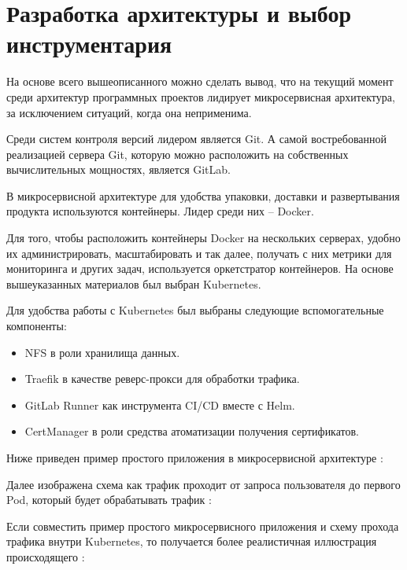 \section{Разработка архитектуры и выбор инструментария}
\label{sec:tools}

На основе всего вышеописанного можно сделать вывод, что на текущий момент среди архитектур программных проектов лидирует микросервисная архитектура, за исключением ситуаций, когда она неприменима.

Среди систем контроля версий лидером является Git. А самой востребованной реализацией сервера Git, которую можно расположить на собственных вычислительных мощностях, является GitLab.

В микросервисной архитектуре для удобства упаковки, доставки и развертывания продукта используются контейнеры. Лидер среди них -- Docker.

Для того, чтобы расположить контейнеры Docker на нескольких серверах, удобно их администрировать, масштабировать и так далее, получать с них метрики для мониторинга и других задач, используется оркетстратор контейнеров. На основе вышеуказанных материалов был выбран Kubernetes.

Для удобства работы с Kubernetes был выбраны следующие вспомогательные компоненты:
\begin{itemize}
    \item NFS в роли хранилища данных.
    \item Traefik в качестве реверс-прокси для обработки трафика.
    \item GitLab Runner как инструмента CI/CD вместе с Helm.
    \item CertManager в роли средства атоматизации получения сертификатов.
\end{itemize}

Ниже приведен пример простого приложения в микросервисной архитектуре :

Далее изображена схема как трафик проходит от запроса пользователя до первого Pod, который будет обрабатывать трафик :

Если совместить пример простого микросервисного приложения  и схему прохода трафика внутри Kubernetes, то получается более реалистичная иллюстрация происходящего :

